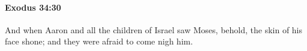 
		\paragraph{Exodus 34:30} %
			\label{EXODUS-34-30}

			And when Aaron and all the children of Israel saw Moses, behold, the skin of his face shone; and they were afraid to come nigh him.


